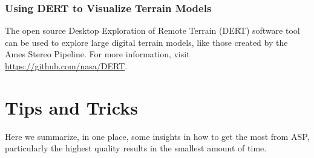 \subsection{Using DERT to Visualize Terrain Models}

The open source Desktop Exploration of Remote Terrain (DERT) software tool
can be used to explore large digital terrain models, like those created by
the Ames Stereo Pipeline.  For more information, visit \url{https://github.com/nasa/DERT}.


\chapter{Tips and Tricks}
\label{tips}

Here we summarize, in one place, some insights in how to get the most
from ASP, particularly the highest quality results in the smallest
amount of time.

